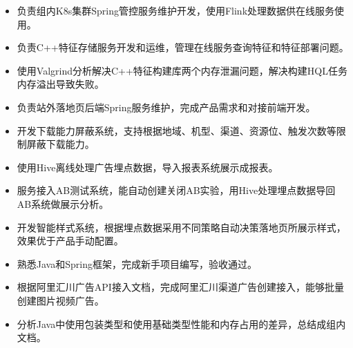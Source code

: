 \documentclass{resume}
\begin{document}

\begin{itemize}
  \item 负责组内K8s集群Spring管控服务维护开发，使用Flink处理数据供在线服务使用。
  \item 负责C++特征存储服务开发和运维，管理在线服务查询特征和特征部署问题。
  \item 使用Valgrind分析解决C++特征构建库两个内存泄漏问题，解决构建HQL任务内存溢出导致失败。
\end{itemize}

\begin{itemize}
  \item 负责站外落地页后端Spring服务维护，完成产品需求和对接前端开发。
  \item 开发下载能力屏蔽系统，支持根据地域、机型、渠道、资源位、触发次数等限制屏蔽下载能力。
  \item 使用Hive离线处理广告埋点数据，导入报表系统展示成报表。
  \item 服务接入AB测试系统，能自动创建关闭AB实验，用Hive处理埋点数据导回AB系统做展示分析。
  \item 开发智能样式系统，根据埋点数据采用不同策略自动决策落地页所展示样式，效果优于产品手动配置。
\end{itemize}

\begin{itemize}
  \item 熟悉Java和Spring框架，完成新手项目编写，验收通过。
  \item 根据阿里汇川广告API接入文档，完成阿里汇川渠道广告创建接入，能够批量创建图片视频广告。
  \item 分析Java中使用包装类型和使用基础类型性能和内存占用的差异，总结成组内文档。
\end{itemize}
\end{document}
